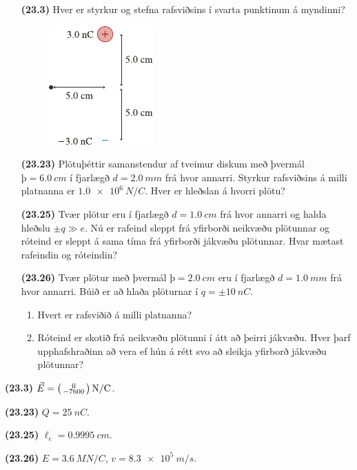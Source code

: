 \begin{enumerate}[label = \textbf{(\alph*)}]

\item[\textbf{(23.3)}] Hver er styrkur og stefna rafsviðsins í svarta punktinum á myndinni?

\begin{figure}[H]
    \centering
    \includegraphics{figures/rk233.pdf}
\end{figure}

\item[\textbf{(23.23)}] Plötuþéttir samanstendur af tveimur diskum með þvermál $þ = \SI{6.0}{cm}$ í fjarlægð $d = \SI{2.0}{mm}$ frá hvor annarri. Styrkur rafsviðsins á milli platnanna er $\SI{1.0e6}{N/C}$. Hver er hleðslan á hvorri plötu?

\item[\textbf{(23.25)}] Tvær plötur eru í fjarlægð $d = \SI{1.0}{cm}$ frá hvor annarri og halda hleðslu $\pm q \gg e$. Nú er rafeind sleppt frá yfirborði neikvæðu plötunnar og róteind er sleppt á sama tíma frá yfirborði jákvæðu plötunnar. Hvar mætast rafeindin og róteindin?

\item[\textbf{(23.26)}] Tvær plötur með þvermál $þ = \SI{2.0}{cm}$ eru í fjarlægð $d = \SI{1.0}{mm}$ frá hvor annarri. Búið er að hlaða plöturnar í $q = \pm\SI{10}{nC}$. 
\begin{enumerate}[label = \textbf{(\alph*)}]
    \item Hvert er rafsviðið á milli platnanna?
    \item Róteind er skotið frá neikvæðu plötunni í átt að þeirri jákvæðu. Hver þarf upphafshraðinn að vera ef hún á rétt svo að sleikja yfirborð jákvæðu plötunnar?
\end{enumerate}

\end{enumerate}

\begin{tcolorbox}
\begin{enumerate*}[label = \vspace{0.15cm} ]
  \item \textbf{(23.3)} $\vec{E} = \smqty(0 \\ -7600) \, \si{N/C}$.
  \item \textbf{(23.23)} $Q = \SI{25}{nC}$.
  \item \textbf{(23.25)} $\ell_e = \SI{0.9995}{cm}$.
  \item \textbf{(23.26)} $E = \SI{3.6}{MN/C}$, $v = \SI{8.3e5}{m/s}$.
\end{enumerate*}
\end{tcolorbox}

